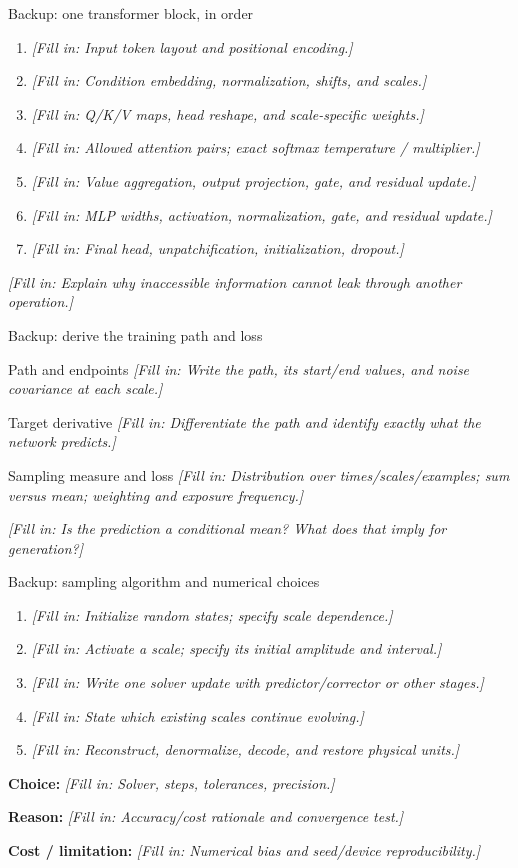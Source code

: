 \documentclass[aspectratio=169,11pt]{beamer}
\newcommand{\fillin}[1]{{\color{prompt}\textit{[Fill in: #1]}}}
\newcommand{\decision}[3]{%
  \textbf{Choice:} \fillin{#1}\par\medskip
  \textbf{Reason:} \fillin{#2}\par\medskip
  \textbf{Cost / limitation:} \fillin{#3}}
\begin{document}
\begin{frame}{Backup: one transformer block, in order}
  \small
  \begin{enumerate}
    \item \fillin{Input token layout and positional encoding.}
    \item \fillin{Condition embedding, normalization, shifts, and scales.}
    \item \fillin{Q/K/V maps, head reshape, and scale-specific weights.}
    \item \fillin{Allowed attention pairs; exact softmax temperature / multiplier.}
    \item \fillin{Value aggregation, output projection, gate, and residual update.}
    \item \fillin{MLP widths, activation, normalization, gate, and residual update.}
    \item \fillin{Final head, unpatchification, initialization, dropout.}
  \end{enumerate}
  \fillin{Explain why inaccessible information cannot leak through another operation.}
\end{frame}

\begin{frame}{Backup: derive the training path and loss}
  \begin{block}{Path and endpoints}
    \fillin{Write the path, its start/end values, and noise covariance at each scale.}
  \end{block}
  \begin{block}{Target derivative}
    \fillin{Differentiate the path and identify exactly what the network predicts.}
  \end{block}
  \begin{block}{Sampling measure and loss}
    \fillin{Distribution over times/scales/examples; sum versus mean; weighting and exposure frequency.}
  \end{block}
  \fillin{Is the prediction a conditional mean? What does that imply for generation?}
\end{frame}

\begin{frame}{Backup: sampling algorithm and numerical choices}
  \begin{enumerate}
    \item \fillin{Initialize random states; specify scale dependence.}
    \item \fillin{Activate a scale; specify its initial amplitude and interval.}
    \item \fillin{Write one solver update with predictor/corrector or other stages.}
    \item \fillin{State which existing scales continue evolving.}
    \item \fillin{Reconstruct, denormalize, decode, and restore physical units.}
  \end{enumerate}
  \medskip
  \decision{Solver, steps, tolerances, precision.}{Accuracy/cost rationale and convergence test.}{Numerical bias and seed/device reproducibility.}
\end{frame}
\end{document}
